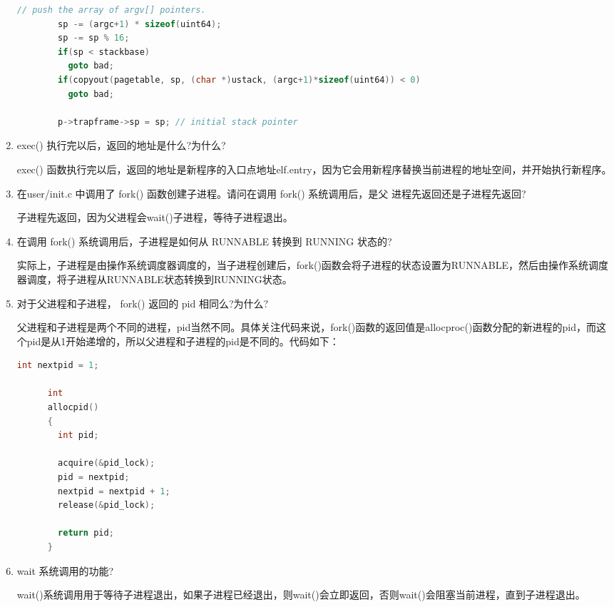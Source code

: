 \documentclass[UTF8]{article}
\begin{document}
\begin{enumerate}
\begin{lstlisting}[language=C]
        // push the array of argv[] pointers.
        sp -= (argc+1) * sizeof(uint64); 
        sp -= sp % 16;
        if(sp < stackbase)
          goto bad;
        if(copyout(pagetable, sp, (char *)ustack, (argc+1)*sizeof(uint64)) < 0)
          goto bad;

        p->trapframe->sp = sp; // initial stack pointer
    \end{lstlisting}

    \item exec() 执行完以后，返回的地址是什么?为什么?
    
    exec() 函数执行完以后，返回的地址是新程序的入口点地址elf.entry，因为它会用新程序替换当前进程的地址空间，并开始执行新程序。
    
    \item 在user/init.c 中调用了 fork() 函数创建子进程。请问在调用 fork() 系统调用后，是父
    进程先返回还是子进程先返回?

    子进程先返回，因为父进程会wait()子进程，等待子进程退出。

    \item 在调用 fork() 系统调用后，子进程是如何从 RUNNABLE 转换到 RUNNING 状态的?
    
    实际上，子进程是由操作系统调度器调度的，当子进程创建后，fork()函数会将子进程的状态设置为RUNNABLE，然后由操作系统调度器调度，将子进程从RUNNABLE状态转换到RUNNING状态。

    \item 对于父进程和子进程， fork() 返回的 pid 相同么?为什么?
  
    父进程和子进程是两个不同的进程，pid当然不同。具体关注代码来说，fork()函数的返回值是allocproc()函数分配的新进程的pid，而这个pid是从1开始递增的，所以父进程和子进程的pid是不同的。代码如下：

    \begin{lstlisting}[language=C]
      int nextpid = 1;

      int
      allocpid()
      {
        int pid;
        
        acquire(&pid_lock);
        pid = nextpid;
        nextpid = nextpid + 1;
        release(&pid_lock);

        return pid;
      }
    \end{lstlisting}

    \item wait 系统调用的功能?
    
    wait()系统调用用于等待子进程退出，如果子进程已经退出，则wait()会立即返回，否则wait()会阻塞当前进程，直到子进程退出。
\end{enumerate}
\end{document}
